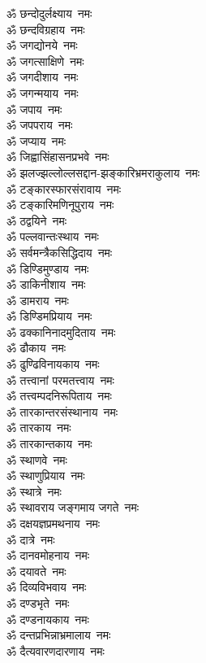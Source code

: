 \begin{multicols}{2}
\begin{flushleft}
ॐ छन्दोदुर्लक्ष्याय~नमः\\
ॐ छन्दविग्रहाय~नमः\\
ॐ जगद्योनये~नमः\\
ॐ जगत्साक्षिणे~नमः\\
ॐ जगदीशाय~नमः\\
ॐ जगन्मयाय~नमः\\
ॐ जपाय~नमः\\
ॐ जपपराय~नमः\hfill{}\\
ॐ जप्याय~नमः\\
ॐ जिह्वासिंहासनप्रभवे~नमः\\
ॐ झलज्झल्लोल्लसद्दान-झङ्कारिभ्रमराकुलाय~नमः\\
ॐ टङ्कारस्फारसंरावाय~नमः\\
ॐ टङ्कारिमणिनूपुराय~नमः\\
ॐ ठद्वयिने~नमः\\
ॐ पल्लवान्तःस्थाय~नमः\\
ॐ सर्वमन्त्रैकसिद्धिदाय~नमः\\
ॐ डिण्डिमुण्डाय~नमः\\
ॐ डाकिनीशाय~नमः\hfill{}\\
ॐ डामराय~नमः\\
ॐ डिण्डिमप्रियाय~नमः\\
ॐ ढक्कानिनादमुदिताय~नमः\\
ॐ ढौकाय~नमः\\
ॐ ढुण्ढिविनायकाय~नमः\\
ॐ तत्त्वानां परमतत्त्वाय~नमः\\
ॐ तत्त्वम्पदनिरूपिताय~नमः\\
ॐ तारकान्तरसंस्थानाय~नमः\\
ॐ तारकाय~नमः\\
ॐ तारकान्तकाय~नमः\hfill{}\\
ॐ स्थाणवे~नमः\\
ॐ स्थाणुप्रियाय~नमः\\
ॐ स्थात्रे~नमः\\
ॐ स्थावराय जङ्गमाय जगते~नमः\\
ॐ दक्षयज्ञप्रमथनाय~नमः\\
ॐ दात्रे~नमः\\
ॐ दानवमोहनाय~नमः\\
ॐ दयावते~नमः\\
ॐ दिव्यविभवाय~नमः\\
ॐ दण्डभृते~नमः\hfill{}\\
ॐ दण्डनायकाय~नमः\\
ॐ दन्तप्रभिन्नाभ्रमालाय~नमः\\
ॐ दैत्यवारणदारणाय~नमः\\

\end{flushleft}
\end{multicols}
